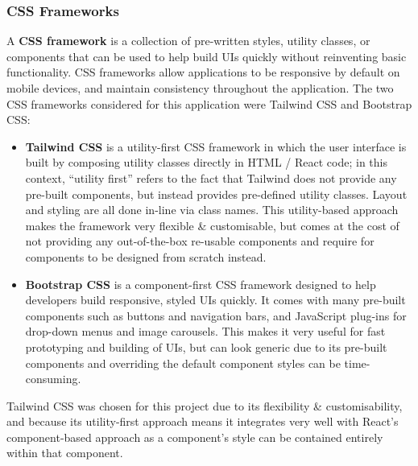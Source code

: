 \documentclass[a4paper,11pt]{report}
\begin{document}
\subsubsection{CSS Frameworks}
A \textbf{CSS framework} is a collection of pre-written styles, utility classes, or components that can be used to help build UIs quickly without reinventing basic functionality.
CSS frameworks allow applications to be responsive by default on mobile devices, and maintain consistency throughout the application.
The two CSS frameworks considered for this application were Tailwind CSS and Bootstrap CSS:
\begin{itemize}
    \item   \textbf{Tailwind CSS}\supercite{tailwind} is a utility-first CSS framework in which the user interface is built by composing utility classes directly in HTML / React code;
            in this context, ``utility first'' refers to the fact that Tailwind does not provide any pre-built components, but instead provides pre-defined utility classes.
            Layout and styling are all done in-line via class names.
            This utility-based approach makes the framework very flexible \& customisable, but comes at the cost of not providing any out-of-the-box re-usable components and require for components to be designed from scratch instead.

    \item   \textbf{Bootstrap CSS}\supercite{bootstrap} is a component-first CSS framework designed to help developers build responsive, styled UIs quickly. 
            It comes with many pre-built components such as buttons and navigation bars, and JavaScript plug-ins for drop-down menus and image carousels.
            This makes it very useful for fast prototyping and building of UIs, but can look generic due to its pre-built components and overriding the default component styles can be time-consuming.
\end{itemize}

Tailwind CSS was chosen for this project due to its flexibility \& customisability, and because its utility-first approach means it integrates very well with React's component-based approach as a component's style can be contained entirely within that component.
\end{document}
